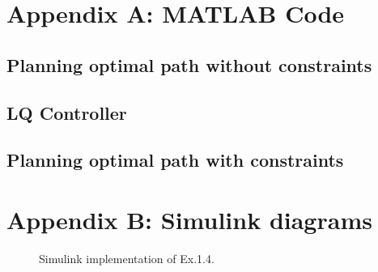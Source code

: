 

\begin{appendices}

\section{Appendix A: MATLAB Code}

\label{appendix:A}



\subsection{Planning optimal path without constraints}





\subsection{LQ Controller}





\subsection{Planning optimal path with constraints}









\section{Appendix B: Simulink diagrams}

\label{appendix:B}

\begin{figure}[H]
    \centering
    \caption{Simulink implementation of Ex.1.4.}
    \label{sim:ex24}
\end{figure}


\end{appendices}
